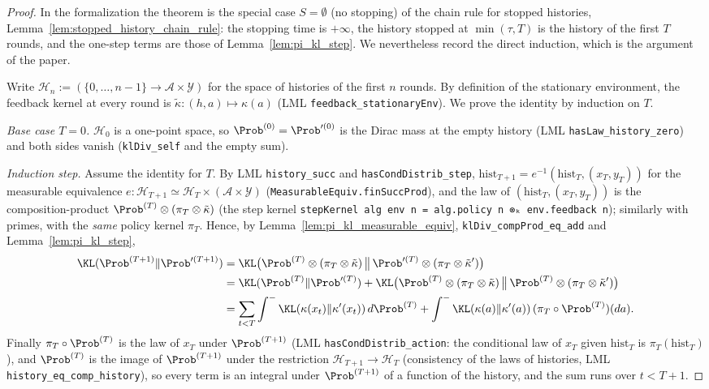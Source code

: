 \begin{proof}
\leanok
{}
In the formalization the theorem is the special case $S = \emptyset$ (no stopping) of the chain
rule for stopped histories, Lemma~\ref{lem:stopped_history_chain_rule}: the stopping time is
$+\infty$, the history stopped at $\min(\tau, T)$ is the history of the first $T$ rounds, and the
one-step terms are those of Lemma~\ref{lem:pi_kl_step}. We nevertheless record the direct
induction, which is the argument of the paper.

Write $\mathcal{H}_n := (\{0,\dots,n-1\} \to \mathcal{A}\times\mathcal{Y})$ for the space of
histories of the first $n$ rounds. By definition of the stationary environment, the feedback
kernel at every round is $\tilde\kappa : (h,a)\mapsto\kappa(a)$ (LML
\texttt{feedback\_stationaryEnv}). We prove the identity by induction on $T$.

\emph{Base case $T = 0$.} $\mathcal{H}_0$ is a one-point space, so $\Prob^{(0)} = \Prob'^{(0)}$
is the Dirac mass at the empty history (LML \texttt{hasLaw\_history\_zero}) and both sides
vanish (\texttt{klDiv\_self} and the empty sum).

\emph{Induction step.} Assume the identity for $T$. By LML \texttt{history\_succ} and
\texttt{hasCondDistrib\_step}, $\mathrm{hist}_{T+1} = e^{-1}(\mathrm{hist}_T, (x_T,y_T))$
for the measurable equivalence $e : \mathcal{H}_{T+1}\simeq\mathcal{H}_T\times(\mathcal{A}\times\mathcal{Y})$
(\texttt{MeasurableEquiv.finSuccProd}), and the law of $(\mathrm{hist}_T,(x_T,y_T))$ is
the composition-product $\Prob^{(T)}\otimes(\pi_T\otimes\tilde\kappa)$ (the step kernel
\texttt{stepKernel alg env n = alg.policy n ⊗ₖ env.feedback n}); similarly with primes, with
the \emph{same} policy kernel $\pi_T$. Hence, by Lemma~\ref{lem:pi_kl_measurable_equiv},
\texttt{klDiv\_compProd\_eq\_add} and Lemma~\ref{lem:pi_kl_step},
\begin{align*}
  \KL(\Prob^{(T+1)}\|\Prob'^{(T+1)})
  &= \KL\big(\Prob^{(T)}\otimes(\pi_T\otimes\tilde\kappa)\,\big\|\,\Prob'^{(T)}\otimes(\pi_T\otimes\tilde\kappa')\big)\\
  &= \KL(\Prob^{(T)}\|\Prob'^{(T)})
     + \KL\big(\Prob^{(T)}\otimes(\pi_T\otimes\tilde\kappa)\,\big\|\,\Prob^{(T)}\otimes(\pi_T\otimes\tilde\kappa')\big)\\
  &= \sum_{t<T}\int^-\KL(\kappa(x_t)\|\kappa'(x_t))\,d\Prob^{(T)}
     + \int^-\KL(\kappa(a)\|\kappa'(a))\,(\pi_T\circ\Prob^{(T)})(da).
\end{align*}
Finally $\pi_T\circ\Prob^{(T)}$ is the law of $x_T$ under $\Prob^{(T+1)}$ (LML
\texttt{hasCondDistrib\_action}: the conditional law of $x_T$ given $\mathrm{hist}_T$ is
$\pi_T(\mathrm{hist}_T)$), and $\Prob^{(T)}$ is the image of $\Prob^{(T+1)}$ under the restriction
$\mathcal{H}_{T+1}\to\mathcal{H}_T$ (consistency of the laws of histories, LML
\texttt{history\_eq\_comp\_history}), so every term is an integral under $\Prob^{(T+1)}$ of a
function of the history, and the sum runs over $t < T+1$.


\end{proof}
